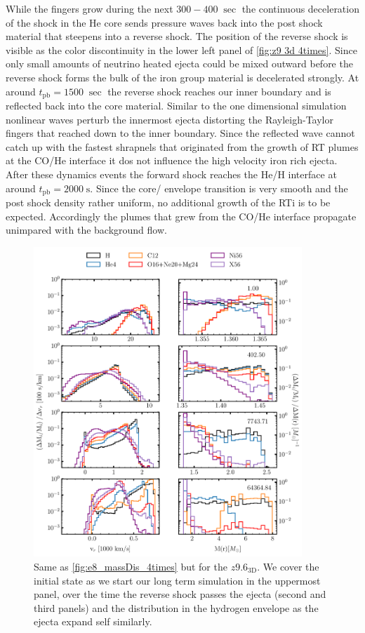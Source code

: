 \documentclass[fleqn,usenatbib]{mnras}
\newcommand{\tpb}{\ensuremath{t_\mathrm{pb}}}
\begin{document}
While the fingers grow during the next $300-400\;\sec$ the continuous deceleration of the shock in the He core sends pressure waves back into the post shock material that steepens into a reverse shock. The position of the reverse shock is visible as the color discontinuity in the lower left panel of \autoref{fig:z9 3d 4times}. Since only small amounts of neutrino heated ejecta could be mixed outward before the reverse shock forms the bulk of the iron group material is decelerated strongly.
At around $\tpb=1500\;\sec$ the reverse shock reaches our inner boundary and is reflected back into the core material.
Similar to the one dimensional simulation nonlinear waves perturb the innermost ejecta distorting the Rayleigh-Taylor fingers that reached down to the inner boundary. Since the reflected wave cannot catch up with the fastest shrapnels that originated from the growth of RT plumes at the CO/He interface it dos not influence the high velocity iron rich ejecta.
After these dynamics events the forward shock reaches the He/H interface at around $t_{\mathrm{pb}}=2000\;\mathrm{s}$. Since the core/ envelope transition is very smooth and the post shock density rather uniform, no additional growth of the RTi is to be expected. Accordingly the plumes that grew from the CO/He interface propagate unimpared with the background flow. 
\begin{figure}
 \centering
 \includegraphics[width=0.9\textwidth]{pic/z93_3d_old_massDis_mvr_mas_4times.pdf}
 \caption{Same as \autoref{fig:e8_massDis_4times} but for the $z9.6_{\mathrm{3D}}$. We cover the initial state as we start our long term simulation in the uppermost panel, over the time the reverse shock passes the ejecta (second and third panels) and the distribution in the hydrogen envelope as the ejecta expand self similarly.}
 \label{fig:z9 massDis}
\end{figure}
\end{document}
